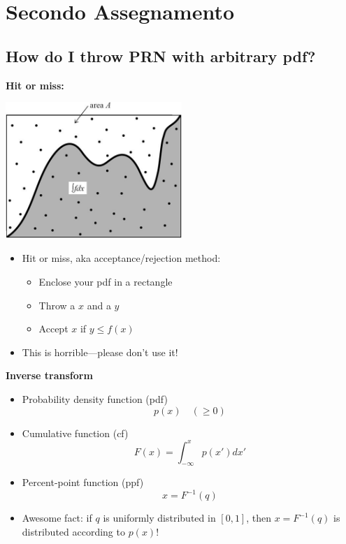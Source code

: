\newpage

\section{Secondo Assegnamento}

\subsection{How do I throw PRN with arbitrary pdf?}


\textbf{Hit or miss:}
\begin{center}
  \includegraphics[width=0.5\textwidth]{lez6/hitmiss.jpg}
\end{center}

  \begin{itemize}
  \item Hit or miss, aka acceptance/rejection method:
    \begin{itemize}
    \item Enclose your pdf in a rectangle
    \item Throw a $x$ and a $y$
    \item Accept $x$ if $y \leq f(x)$
    \end{itemize}
  \item \alert{This is horrible---please don't use it!}
  \end{itemize}


\noindent
\textbf{Inverse transform}

  \begin{itemize}
  \item Probability density function (pdf)
    $$
    p(x) \quad (\ge 0)
    $$
  \item Cumulative function (cf)
    $$
    F(x) = \int_{-\infty}^{x} p(x') dx'
    $$
  \item Percent-point function (ppf)
    $$
    x = F^{-1}(q)
    $$
  \item \alert{Awesome fact: if $q$ is uniformly distributed in $[0, 1]$,
    then $x = F^{-1}(q)$ is distributed according to $p(x)$!}
  \end{itemize}


